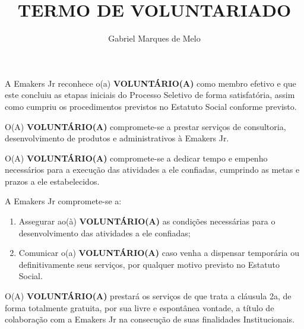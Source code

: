 





\def\titulo{TERMO DE VOLUNTARIADO}

\def\nome{NOME}
\def\profissao{PROFISSÃO}
\def\nacionalidade{NACIONALIDADE}
\def\estadoCivil{ESTADO CIVIL}
\def\rua{RUA}
\def\numero{NÚMERO}
\def\bairro{BAIRRO}
\def\cidadeUF{CIDADE/UF}
\def\cpf{111.111.111-11}
\def\rg{11.111.111}

\title{\titulo}
\author{Gabriel Marques de Melo}



    \initdoc
    \contratada
    \voluntario

    \clausula A Emakers Jr reconhece o(a) \textbf{VOLUNTÁRIO(A)} como membro efetivo e que
    este concluiu as etapas iniciais do Processo Seletivo de forma satisfatória, assim como cumpriu
    os procedimentos previstos no Estatuto Social conforme previsto.

    \clausula O(A) \textbf{VOLUNTÁRIO(A)} compromete-se a prestar serviços de consultoria,
    desenvolvimento de produtos e administrativos à Emakers Jr.

    \paragrafo O(A) \textbf{VOLUNTÁRIO(A)} compromete-se a dedicar tempo e empenho
    necessários para a execução das atividades a ele confiadas, cumprindo as metas e prazos a ele
    estabelecidos.

    \clausula A Emakers Jr compromete-se a:
    \begin{enumerate}
        \item Assegurar ao(à) \textbf{VOLUNTÁRIO(A)} as condições necessárias para o desenvolvimento
              das atividades a ele confiadas;
        \item Comunicar o(a) \textbf{VOLUNTÁRIO(A)} caso venha a dispensar temporária ou
              definitivamente seus serviços, por qualquer motivo previsto no Estatuto Social.
    \end{enumerate}

    
    \clausula O(A) \textbf{VOLUNTÁRIO(A)} prestará os serviços de que trata a cláusula 2a, de forma
    totalmente gratuita, por sua livre e espontânea vontade, a título de colaboração com a Emakers
    Jr na consecução de suas finalidades Institucionais.

